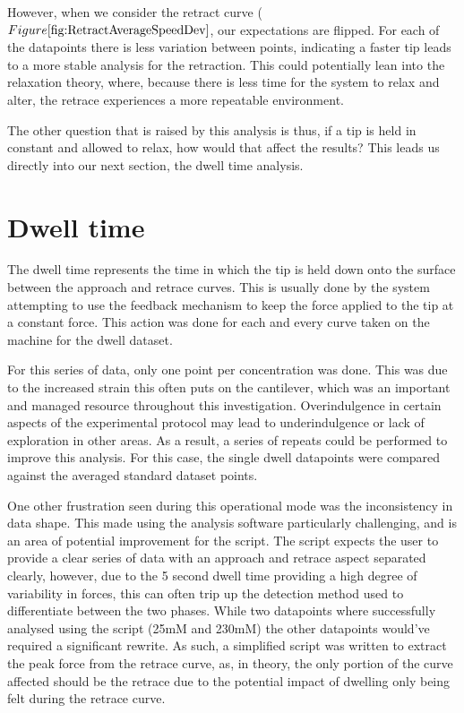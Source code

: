 However, when we consider the retract curve ($Figure \ref{fig:RetractAverageSpeedDev}$, our expectations are flipped. For each of the datapoints there is less variation between points, indicating a faster tip leads to a more stable analysis for the retraction. This could potentially lean into the relaxation theory, where, because there is less time for the system to relax and alter, the retrace experiences a more repeatable environment.

The other question that is raised by this analysis is thus, if a tip is held in constant and allowed to relax, how would that affect the results? This leads us directly into our next section, the dwell time analysis.

\section{Dwell time}

The dwell time represents the time in which the tip is held down onto the surface between the approach and retrace curves. This is usually done by the system attempting to use the feedback mechanism to keep the force applied to the tip at a constant force. This action was done for each and every curve taken on the machine for the dwell dataset.

For this series of data, only one point per concentration was done. This was due to the increased strain this often puts on the cantilever, which was an important and managed resource throughout this investigation. Overindulgence in certain aspects of the experimental protocol may lead to underindulgence or lack of exploration in other areas. As a result, a series of repeats could be performed to improve this analysis. For this case, the single dwell datapoints were compared against the averaged standard dataset points.

One other frustration seen during this operational mode was the inconsistency in data shape. This made using the analysis software particularly challenging, and is an area of potential improvement for the script. The script expects the user to provide a clear series of data with an approach and retrace aspect separated clearly, however, due to the 5 second dwell time providing a high degree of variability in forces, this can often trip up the detection method used to differentiate between the two phases. While two datapoints where successfully analysed using the script (25mM and 230mM) the other datapoints would've required a significant rewrite. As such, a simplified script was written to extract the peak force from the retrace curve, as, in theory, the only portion of the curve affected should be the retrace due to the potential impact of dwelling only being felt during the retrace curve.

